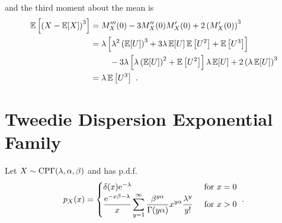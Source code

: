 and the third moment about the mean is
\begin{align}
  \expectation\left[\left(X-\expectation[X]\right)^3\right] & =
  M_X'''(0) - 3M_X''(0)M_X'(0) + 2\left(M_X'(0)\right)^3
  \nonumber\\
  &=
  \begin{multlined}[t]
    \lambda \left[
      \lambda^2 \left(\expectation[U]\right)^3 + 3\lambda \expectation[U]\expectation\left[U^2\right] + \expectation\left[U^3\right]
    \right]
    \\-3\lambda\left[\lambda\left(\expectation[U]\right)^2+\expectation\left[U^2\right]\right]\lambda\expectation[U] + 2\left(\lambda\expectation[U]\right)^3
  \end{multlined}
  \nonumber\\
  &=\lambda\expectation\left[U^3\right] \ .
\end{align}

\section{Tweedie Dispersion Exponential Family}
\label{chapter:appendix_tweedie}
Let $X\sim\operatorname{CP\Gamma}(\lambda,\alpha,\beta)$ and has p.d.f.
\begin{equation}
  p_X(x) = 
  \begin{cases}
    \delta(x) \mathrm{e}^{-\lambda} & \text{ for } x=0 \\ 
    \dfrac{\mathrm{e}^{-x\beta-\lambda}}{x}
    \displaystyle\sum_{y=1}^{\infty}\dfrac{\beta^{y\alpha}}{\Gamma(y\alpha)}x^{y\alpha}\frac{\lambda^y}{y!} & \text{ for } x>0
  \end{cases}
  \ .
  \label{eq:appendix_compoundPoisson_pdf}
\end{equation}

